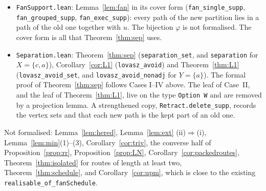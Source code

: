 \documentclass[11pt]{amsart}
\theoremstyle{definition}
\begin{document}
\begin{itemize}
with at most one end at every vertex and an end at every tail, satisfying (RR1) and (RR2), then $M$ is
realisable. The routes are appended one at a time, and compatibility is shown to pass to each
intermediate decomposition. As a consequence, \texttt{gallai\_of\_routeRR} derives Gallai's conjecture
from Conjecture~\ref{conj:rr} in the following form: every connected graph of even order has a routed
pairing all of whose transversals admit compatible Lov\'asz decompositions. The existential form
(\texttt{gallai\_of\_routeRRExists}) asks this only for one transversal through each even vertex.
\item \texttt{FanSupport.lean}: Lemma~\ref{lem:fan} in its cover form (\texttt{fan\_single\_supp},
\texttt{fan\_grouped\_supp}, \texttt{fan\_exec\_supp}): every path of the new partition lies in a path of
the old one together with $u$. The bijection $\varphi$ is not formalised. The cover form is all that
Theorem~\ref{thm:sep} uses.
\item \texttt{Separation.lean}: Theorem~\ref{thm:sep} (\texttt{separation\_set}, and
\texttt{separation} for $X=\{c,a\}$), Corollary~\ref{cor:L1} (\texttt{lovasz\_avoid}) and
Theorem~\ref{thm:L1} (\texttt{lovasz\_avoid\_set}, and \texttt{lovasz\_avoid\_nonadj} for $Y=\{a\}$). The
formal proof of Theorem~\ref{thm:sep} follows Cases I--IV above. The leaf of Case~II, and the leaf
of Theorem~\ref{thm:L1}, live on the type \texttt{Option W} and are removed by a projection lemma. A
strengthened copy, \texttt{Retract.delete\_supp}, records the vertex sets and that each new path is the
kept part of an old one.
\end{itemize}
Not formalised: Lemma~\ref{lem:hered}, Lemma~\ref{lem:ext} (ii)$\Rightarrow$(i), Lemma~\ref{lem:min}(1)--(3),
Corollary~\ref{cor:triv}, the converse half of Proposition~\ref{prop:rr}, Proposition~\ref{prop:LN},
Corollary~\ref{cor:packedroutes}, Theorem~\ref{thm:isolated} for routes of length at least two,
Theorem~\ref{thm:schedule}, and Corollary~\ref{cor:upm}, which is close to the existing
\texttt{realisable\_of\_fanSchedule}.
\end{document}
